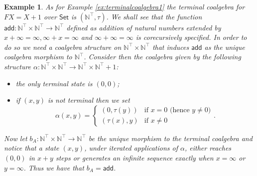 \documentclass[letterpaper, 11pt, oneside]{memoir}
\theoremstyle{myteo}
\newtheorem{example}[theorem]{Example}
\numberwithin{equation}{section}
\newcommand{\Set}{\textsf{Set}}
\begin{document}
\begin{example}
  \label{ex:corecursive-specification-of-addition}
  As for Example \ref{ex:terminalcoalgebra1} the terminal coalgebra for \(FX = X + 1\) over \(\Set\) is \((\mathbb{N}^\top, \tau)\).
  We shall see that the function \(\textsf{add} : \mathbb{N}^\top \times \mathbb{N}^\top \to \mathbb{N}^\top\) defined as addition of natural numbers extended by \(x + \infty = \infty, \infty + x = \infty\) and \(\infty + \infty = \infty\) is corecursively specified.
  In order to do so we need a coalgebra structure on \(\mathbb{N}^\top \times \mathbb{N}^\top\) that induces \(\textsf{add}\) as the unique coalgebra morphism to \(\mathbb{N}^\top\).
  Consider then the coalgebra given by the following structure \(\alpha: \mathbb{N}^\top \times \mathbb{N}^\top \to \mathbb{N}^\top \times \mathbb{N}^\top + 1\):
  \begin{itemize}
  \item[1.] the only terminal state is \((0, 0)\);
  \item[2.] if \((x, y)\) is not terminal then we set
    \begin{equation*}
      \alpha(x, y) =
      \begin{cases}
        (0, \tau(y)) & \text{if } x = 0 \text{ (hence \(y \neq 0\))}\\
        (\tau(x), y) & \text{if } x \neq 0
      \end{cases}.
    \end{equation*}
  \end{itemize}
  Now let \(b_A : \mathbb{N}^\top \times \mathbb{N}^\top \to \mathbb{N}^\top\) be the unique morphism to the terminal coalgebra and notice that a state \((x, y)\), under iterated applications of \(\alpha\), either reaches \((0, 0)\) in \(x + y\) steps or generates an infinite sequence exactly when \(x = \infty\) or \(y = \infty\).
  Thus we have that \(b_A = \textsf{add}\).
\end{example}
\end{document}
